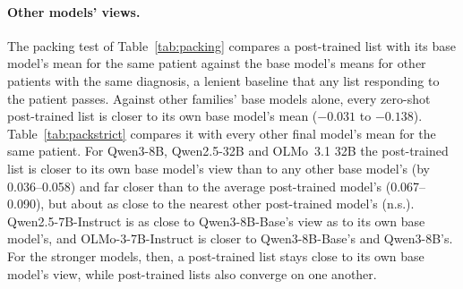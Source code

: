 \documentclass[wcp]{jmlr}
\begin{document}
\paragraph{Other models' views.} The packing test of Table~\ref{tab:packing} compares a post-trained list with its base model's mean for the same patient against the base model's means for other patients with the same diagnosis, a lenient baseline that any list responding to the patient passes. Against other families' base models alone, every zero-shot post-trained list is closer to its own base model's mean ($-0.031$ to $-0.138$). Table~\ref{tab:packstrict} compares it with every other final model's mean for the same patient. For Qwen3-8B, Qwen2.5-32B and OLMo~3.1 32B the post-trained list is closer to its own base model's view than to any other base model's (by 0.036--0.058) and far closer than to the average post-trained model's (0.067--0.090), but about as close to the nearest other post-trained model's (n.s.). Qwen2.5-7B-Instruct is as close to Qwen3-8B-Base's view as to its own base model's, and OLMo-3-7B-Instruct is closer to Qwen3-8B-Base's and Qwen3-8B's. For the stronger models, then, a post-trained list stays close to its own base model's view, while post-trained lists also converge on one another.
\end{document}
